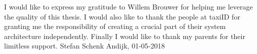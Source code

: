 
\noindent\begin{acknowledgements}

I would like to express my gratitude to Willem Brouwer for helping me leverage the quality of this thesis. \newline
I would also like to thank the people at taxiID for granting me the responsibility of creating a crucial part of their system architecture independently. \newline
Finally I would like to thank my parents for their limitless support. \newline
Stefan Schenk \newline
Andijk, 01-05-2018
\end{acknowledgements}
